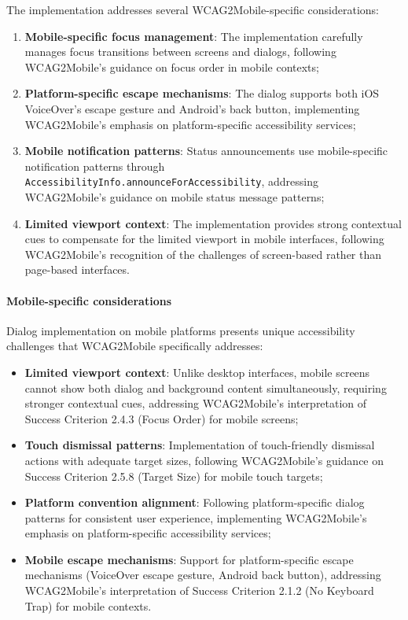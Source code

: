 The implementation addresses several WCAG2Mobile-specific considerations:

\begin{enumerate}
    \item \textbf{Mobile-specific focus management}: The implementation carefully manages focus transitions between screens and dialogs, following WCAG2Mobile's guidance on focus order in mobile contexts;
    
    \item \textbf{Platform-specific escape mechanisms}: The dialog supports both iOS VoiceOver's escape gesture and Android's back button, implementing WCAG2Mobile's emphasis on platform-specific accessibility services;
    
    \item \textbf{Mobile notification patterns}: Status announcements use mobile-specific notification patterns through \texttt{AccessibilityInfo.announceForAccessibility}, addressing WCAG2Mobile's guidance on mobile status message patterns;
    
    \item \textbf{Limited viewport context}: The implementation provides strong contextual cues to compensate for the limited viewport in mobile interfaces, following WCAG2Mobile's recognition of the challenges of screen-based rather than page-based interfaces.
\end{enumerate}

\paragraph{Mobile-specific considerations}

Dialog implementation on mobile platforms presents unique accessibility challenges that WCAG2Mobile specifically addresses:

\begin{itemize}
    \item \textbf{Limited viewport context}: Unlike desktop interfaces, mobile screens cannot show both dialog and background content simultaneously, requiring stronger contextual cues, addressing WCAG2Mobile's interpretation of Success Criterion 2.4.3 (Focus Order) for mobile screens;
    
    \item \textbf{Touch dismissal patterns}: Implementation of touch-friendly dismissal actions with adequate target sizes, following WCAG2Mobile's guidance on Success Criterion 2.5.8 (Target Size) for mobile touch targets;
    
    \item \textbf{Platform convention alignment}: Following platform-specific dialog patterns for consistent user experience, implementing WCAG2Mobile's emphasis on platform-specific accessibility services;
    
    \item \textbf{Mobile escape mechanisms}: Support for platform-specific escape mechanisms (VoiceOver escape gesture, Android back button), addressing WCAG2Mobile's interpretation of Success Criterion 2.1.2 (No Keyboard Trap) for mobile contexts.
\end{itemize}

